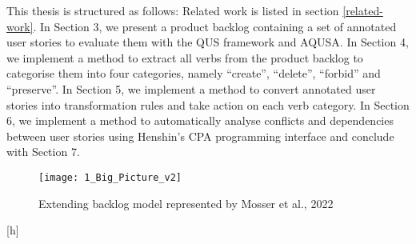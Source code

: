 This thesis is structured as follows: Related work is listed in section \ref{related-work}. In Section 3, we present a product backlog containing a set of annotated user stories to evaluate them with the QUS framework and AQUSA. In Section 4, we implement a method to extract all verbs from the product backlog to categorise them into four categories, namely \enquote{create}, \enquote{delete}, \enquote{forbid} and \enquote{preserve}. In Section 5, we implement a method to convert annotated user stories into transformation rules and take action on each verb category. In Section 6, we implement a method to automatically analyse conflicts and dependencies between user stories using Henshin's CPA programming interface and conclude with Section 7.
\begin{figure}[h]
\centering
\texttt{[image: 1\_Big\_Picture\_v2]}
\caption{Extending backlog model represented by Mosser et al., 2022\cite{mosser2022modelling}}\label{fig:workflow_diagram}
\end{figure}[h]
